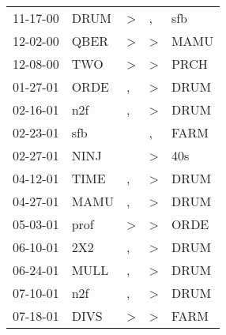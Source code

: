 \begin{supertabular}{p{0.07\textwidth}p{0.06\textwidth}p{0.02\textwidth}p{0.02\textwidth}p{0.06\textwidth}}
          11-17-00\textsuperscript{} &           DRUM\textsuperscript{} &     \textgreater &                , &            sfb\textsuperscript{} \\
          12-02-00\textsuperscript{} &           QBER\textsuperscript{} &     \textgreater &     \textgreater &           MAMU\textsuperscript{} \\
          12-08-00\textsuperscript{} &            TWO\textsuperscript{} &     \textgreater &     \textgreater &           PRCH\textsuperscript{} \\
          01-27-01\textsuperscript{} &           ORDE\textsuperscript{} &                , &     \textgreater &           DRUM\textsuperscript{} \\
          02-16-01\textsuperscript{} &            n2f\textsuperscript{} &                , &     \textgreater &           DRUM\textsuperscript{} \\
          02-23-01\textsuperscript{} &            sfb\textsuperscript{} &                  &                , &           FARM\textsuperscript{} \\
          02-27-01\textsuperscript{} &           NINJ\textsuperscript{} &                  &     \textgreater &            40s\textsuperscript{} \\
          04-12-01\textsuperscript{} &           TIME\textsuperscript{} &                , &     \textgreater &           DRUM\textsuperscript{} \\
          04-27-01\textsuperscript{} &           MAMU\textsuperscript{} &                , &     \textgreater &           DRUM\textsuperscript{} \\
          05-03-01\textsuperscript{} &           prof\textsuperscript{} &     \textgreater &     \textgreater &           ORDE\textsuperscript{} \\
          06-10-01\textsuperscript{} &            2X2\textsuperscript{} &                , &     \textgreater &           DRUM\textsuperscript{} \\
          06-24-01\textsuperscript{} &           MULL\textsuperscript{} &                , &     \textgreater &           DRUM\textsuperscript{} \\
          07-10-01\textsuperscript{} &            n2f\textsuperscript{} &                , &     \textgreater &           DRUM\textsuperscript{} \\
          07-18-01\textsuperscript{} &           DIVS\textsuperscript{} &     \textgreater &     \textgreater &           FARM\textsuperscript{} \\

\end{supertabular}
